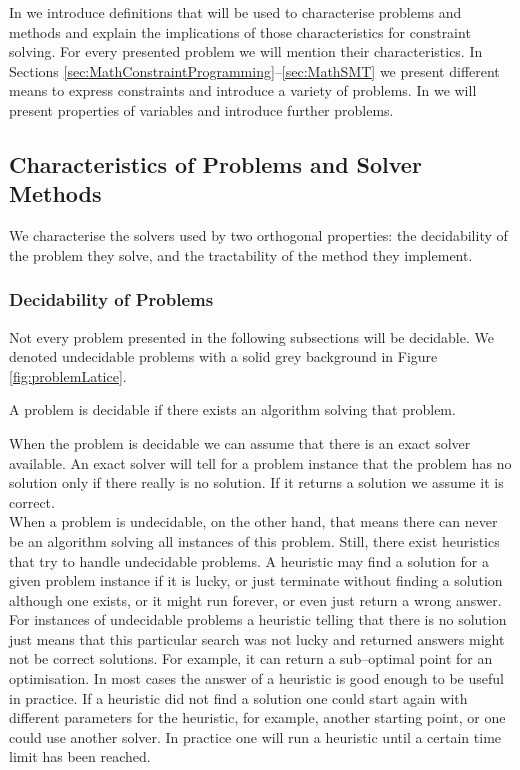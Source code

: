 In  we introduce definitions that will be used to characterise problems and methods and explain the implications of those characteristics for constraint solving. For every presented problem we will mention their characteristics. In Sections \ref{sec:MathConstraintProgramming}--\ref{sec:MathSMT} we present different means to express constraints and introduce a variety of problems. In  we will present properties of variables and introduce further problems.
\subsection{Characteristics of Problems and Solver Methods}
\label{sec:computability}
We characterise the solvers used by two orthogonal properties: the decidability of the problem they solve, and the tractability of the method they implement.
\subsubsection{Decidability of Problems}
Not every problem presented in the following subsections will be decidable. We denoted undecidable problems with a solid grey background in Figure \ref{fig:problemLatice}. 
\begin{definition}[decidability]
A problem is decidable if there exists an algorithm solving that problem. 
\end{definition}
When the problem is decidable we can assume that there is an exact solver available. An exact solver will tell for a problem instance that the problem has no solution only if there really is no solution. If it returns a solution we assume it is correct.\\
When a problem is undecidable, on the other hand, that means there can never be an algorithm solving all instances of this problem. 
Still, there exist heuristics that try to handle undecidable problems. A heuristic may find a solution for a given problem instance if it is lucky, or just terminate without finding a solution although one exists, or it might run forever, or even just return a wrong answer. For instances of undecidable problems a heuristic telling that there is no solution just means that this particular search was not lucky and returned answers might not be correct solutions. For example, it can return a sub--optimal point for an optimisation. In most cases the answer of a heuristic is good enough to be useful in practice. 
If a heuristic did not find a solution one could start again with different parameters for the heuristic, for example, another starting point, or one could use another solver. In practice one will run a heuristic until a certain time limit has been reached.
